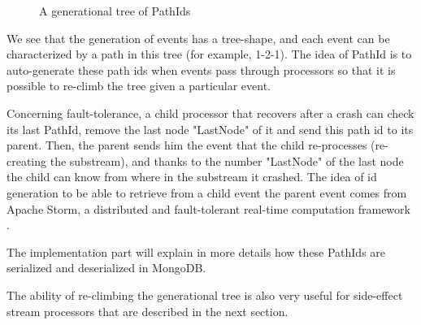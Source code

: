 \begin{figure}[h]
  \begin{center} 
    \caption{A generational tree of PathIds}
    \label{fig:treepathid}
  \end{center}
\end{figure}

We see that the generation of events has a tree-shape, and each event can be characterized by a path in this tree (for example, 1-2-1). The idea of PathId is to
auto-generate these path ids when events pass through processors so that it is possible to re-climb the tree given a particular event.

Concerning fault-tolerance, a child processor that recovers after a crash can check its last PathId, remove the last node "LastNode" of it and send this path id to its parent. Then, the parent sends him the event that the child re-processes (re-creating the substream), and thanks to the number "LastNode" of the last node the child can know from where in the substream it crashed. The idea of id generation to be able to retrieve from a child event the parent event comes from Apache Storm, a distributed and fault-tolerant real-time computation framework .

The implementation part will explain in more details how these PathIds are serialized and deserialized in MongoDB.

The ability of re-climbing the generational tree is also very useful for side-effect stream processors that are described in the next section.

